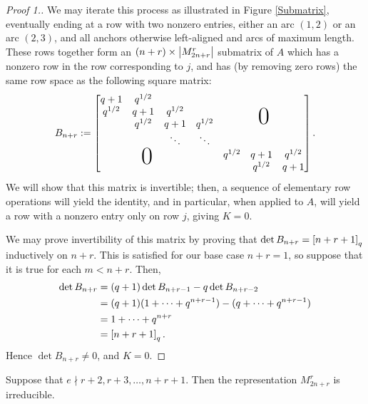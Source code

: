 \documentclass{amsart}
\begin{document}
\begin{proof}[Proof 1.]
  We may iterate this process as illustrated in Figure \ref{Submatrix}, eventually ending at a row with two nonzero entries, either an arc $(1,2)$ or an arc $(2,3)$, and all anchors otherwise left-aligned and arcs of maximum length.
  These rows together form an $(n + r) \times \left| M_{2n + r}^r \right|$ submatrix of $A$ which has a nonzero row in the row corresponding to $j$, and has (by removing zero rows) the same row space as the following square matrix:
  \newcommand*\bigzero{\makebox(0,15){\text{\Huge0}}}
  \newcommand*\bigzerotwo{\makebox(-20,15){\text{\Huge0}}}
  \begin{equation}\label{Bnr}
    B_{n + r} := \begin{bmatrix}
      \begin{matrix}
      q + 1 & q^{1/2} & \\
      q^{1/2} & q + 1 & q^{1/2}\\
      & q^{1/2} & q + 1 & q^{1/2}\\
      &  & \ddots & \ddots
      \end{matrix}
      &   \bigzero\\
      \bigzerotwo & \begin{matrix}
        q^{1/2} & q+1 & q^{1/2}\\
        &  q^{1/2} & q + 1
       \end{matrix}
    \end{bmatrix}.
  \end{equation}
  We will show that this matrix is invertible;
  then, a sequence of elementary row operations will yield the identity, and in particular, when applied to $A$, will yield a row with a nonzero entry only on row $j$, giving $K = 0$.

  We may prove invertibility of this matrix by proving that $\det B_{n + r} = \left[ n + r + 1 \right]_q$ inductively on $n+r$.
  This is satisfied for our base case $n + r = 1$, so suppose that it is true for each $m < n + r$.
  Then,
  \begin{align*}
    \det B_{n+r} &= (q + 1) \det B_{n + r - 1} - q \det B_{n + r - 2}\\
    &= (q + 1)(1 + \dots + q^{n + r - 1}) - (q + \dots + q^{n + r - 1})\\
    &= 1 + \dots + q^{n + r}\\
    &= \left[ n + r + 1 \right]_q.
  \end{align*}
  Hence $\det B_{n + r} \neq 0$, and $K = 0$.
\end{proof}
\begin{theorem}\label{Irreducibility Theorem}
  Suppose that $e \nmid r+2,r+3,\dots,n+r+1$.
  Then the representation $M_{2n + r}^r$ is irreducible. 
\end{theorem}
\end{document}
